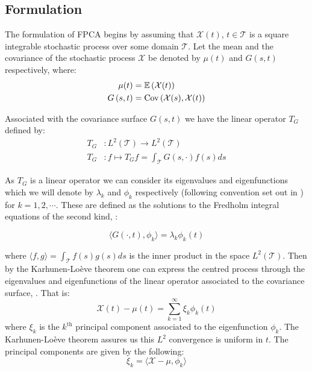 \subsection{Formulation}
The formulation of FPCA begins by assuming that $\mathcal{X}(t)$, $t \in \mathcal{T}$ is a square integrable stochastic process over some domain $\mathcal{T}$.
Let the mean and the covariance of the stochastic process $\mathcal{X}$ be denoted by $\mu(t)$ and $G\left(s, t\right)$ respectively, where:
\begin{align}
	\mu(t) &= \operatorname{\mathbb{E}} \left(\mathcal{X}(t)\right) \label{eqn:mean_fn}\\
	G\left(s, t\right) &= \text{Cov}\left(\mathcal{X}(s),  \mathcal{X}(t)\right) \label{eqn:cov_fn}
\end{align}

Associated with the covariance surface $G\left(s, t\right)$ we have the linear operator $T_G$ defined by:
\begin{align}
	T_G &: L^2\left(\mathcal{T}\right) \to L^2\left(\mathcal{T}\right) \\
	T_G&:  f \mapsto T_G f = \int_{\mathcal{T}} G\left(s, \cdot \right) f(s) ds \label{eqn:t_op}
\end{align}

As $T_G$ is a linear operator we can consider its eigenvalues and eigenfunctions which we will denote by $\lambda_k$ and $\phi_k$ respectively (following convention set out in \citep{yao_functional_2005}) for $k=1,2,\cdots$.
These are defined as the solutions to the Fredholm integral equations of the second kind, \citep{yao_functional_2005}: 

\begin{equation}\label{eqn:fredholm}
	\langle G(\cdot, t), \phi_k \rangle = \lambda_k \phi_k(t)
\end{equation}

where $\langle f, g \rangle = \int_{\mathcal{T}} f(s) g(s) ds$ is the inner product in the space $L^2(\mathcal{T})$. 
Then by the Karhunen-Lo\`{e}ve theorem one can express the centred process through the eigenvalues and eigenfunctions of the linear operator associated to the covariance surface, \citep{karhunen_zur_1946, loeve_fonctions_1946}.
That is:
\begin{equation}\label{eqn:fpca}
	\mathcal{X}(t) - \mu(t) = \sum_{k=1}^{\infty}\xi_k \phi_k(t)
\end{equation}
where $\xi_k$ is the $k^\text{th}$ principal component associated to the eigenfunction $\phi_k$.
The Karhunen-Lo\`{e}ve theorem assures us this $L^2$ convergence is uniform in $t$.
The principal components are given by the following: 
\begin{equation}\label{eqn:principal_comp}
	\xi_k= \langle \mathcal{X} - \mu, \phi_k \rangle 
\end{equation}

